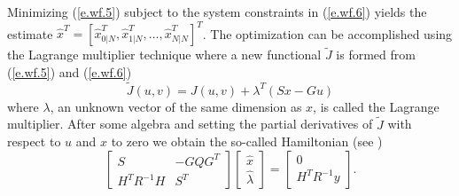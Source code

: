 	Minimizing (\ref{e.wf.5}) subject to the system constraints
in (\ref{e.wf.6}) yields the estimate 
$\hat{x}^T=[\hat{x}_{0|N}^T,\hat{x}_{1|N}^T,\ldots,\hat{x}_{N|N}^T]^T$.
The optimization can be accomplished using the Lagrange
multiplier technique where a new functional
$\tilde{J}$ is formed from (\ref{e.wf.5}) and (\ref{e.wf.6})
%
\begin{equation}
\tilde{J}(u,v)=J(u,v)+\lambda^T(Sx-Gu)
\label{e.wf.7}
\end{equation}
%
where $\lambda$, an unknown vector of the same dimension as $x$,
is called the Lagrange multiplier.
After some algebra and setting the partial derivatives of $\tilde{J}$
with respect to $u$ and $x$ to zero we obtain the 
so-called Hamiltonian (see \cite{Kailath2})
%
\begin{equation}
\left[\begin{array}{cc}
         S&-GQG^T\\
         H^TR^{-1}H&S^T\end{array}\right]
\left[\begin{array}{c}
         \hat{x}\\
         \hat{\lambda}\end{array}\right]
=
\left[\begin{array}{c}
         0\\
         H^TR^{-1}y\end{array}\right].
\label{e.wf.8}
\end{equation}
%

